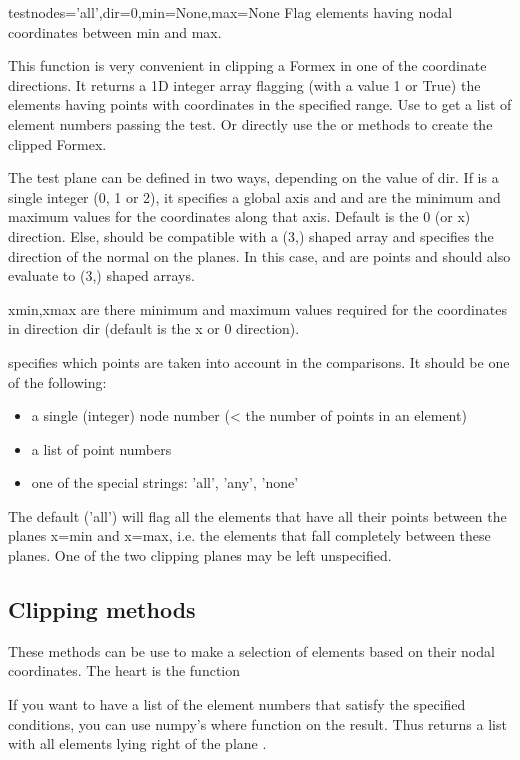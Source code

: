 \begin{methoddesc}{test}{nodes='all',dir=0,min=None,max=None}
Flag elements having nodal coordinates between min and max.

This function is very convenient in clipping a Formex in one of
the coordinate directions. It returns a 1D integer array flagging
(with a value 1 or True) the elements having points with coordinates in the
specified range.
Use  to get a list of element numbers passing the test.
Or directly use the  or  methods to create the clipped Formex.
       
The test plane can be defined in two ways, depending on the value of dir.
If  is a single integer (0, 1 or 2), it specifies a global axis
and  and  are the minimum and maximum values for the
coordinates along that axis.
Default is the 0 (or x) direction.
Else,  should be compatible with a (3,) shaped array and specifies
the direction of the normal on the planes. In this case,  and 
are points and should also evaluate to (3,) shaped arrays.

xmin,xmax are there minimum and maximum values required for the
coordinates in direction dir (default is the x or 0 direction).

 specifies which points are taken into account in the comparisons.
It should be one of the following:
\begin{itemize}
\item a single (integer) node number (< the number of points in an element)
\item a list of point numbers
\item one of the special strings: 'all', 'any', 'none'
\end{itemize}
The default ('all') will flag all the elements that have all their
points between the planes x=min and x=max, i.e. the elements that
fall completely between these planes. One of the two clipping planes
may be left unspecified.
\end{methoddesc}


\subsection{Clipping methods}
These methods can be use to make a selection of elements based on their nodal coordinates. The heart is the function

If you want to have a list of the element numbers that satisfy the specified conditions, you can use numpy's where function on the result. Thus  returns a list with all elements lying right of the plane .

